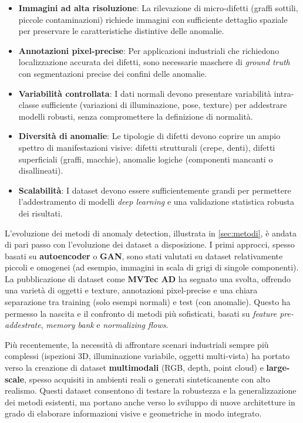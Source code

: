 \begin{itemize}
\item \textbf{Immagini ad alta risoluzione}: La rilevazione di micro-difetti (graffi sottili, piccole contaminazioni) richiede immagini con sufficiente dettaglio spaziale per preservare le caratteristiche distintive delle anomalie.

\item \textbf{Annotazioni pixel-precise}: Per applicazioni industriali che richiedono localizzazione accurata dei difetti, sono necessarie maschere di \textit{ground truth} con segmentazioni precise dei confini delle anomalie.

\item \textbf{Variabilità controllata}: I dati normali devono presentare variabilità intra-classe sufficiente (variazioni di illuminazione, pose, texture) per addestrare modelli robusti, senza compromettere la definizione di normalità.

\item \textbf{Diversità di anomalie}: Le tipologie di difetti devono coprire un ampio spettro di manifestazioni visive: difetti strutturali (crepe, denti), difetti superficiali (graffi, macchie), anomalie logiche (componenti mancanti o disallineati).

\item \textbf{Scalabilità}: I dataset devono essere sufficientemente grandi per permettere l'addestramento di modelli \emph{deep learning} e una validazione statistica robusta dei risultati.
\end{itemize}

%

L'evoluzione dei metodi di anomaly detection, illustrata in \ref{sec:metodi}, è andata di pari passo con l'evoluzione dei dataset a disposizione. I primi approcci, spesso basati su \textbf{autoencoder} o \textbf{GAN}, sono stati valutati su dataset relativamente piccoli e omogenei (ad esempio, immagini in scala di grigi di singole componenti). La pubblicazione di dataset come \textbf{MVTec AD} ha segnato una svolta, offrendo una varietà di oggetti e texture, annotazioni pixel-precise e una chiara separazione tra training (solo esempi normali) e test (con anomalie). Questo ha permesso la nascita e il confronto di metodi più sofisticati, basati su \textit{feature pre-addestrate}, \textit{memory bank} e \textit{normalizing flows}. 


Più recentemente, la necessità di affrontare scenari industriali sempre più complessi (ispezioni 3D, illuminazione variabile, oggetti multi-vista) ha portato verso la creazione di dataset \textbf{multimodali} (RGB, depth, point cloud) e \textbf{large-scale}, spesso acquisiti in ambienti reali o generati sinteticamente con alto rea\-li\-smo. Questi dataset consentono di testare la robustezza e la generalizzazione dei metodi esistenti, ma portano anche verso lo sviluppo di nuove architetture in grado di elaborare informazioni visive e geometriche in modo integrato.

